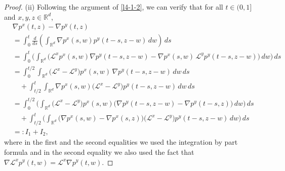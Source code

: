 \documentclass[a4paper,11pt]{amsart}
\newcommand{\R}{\mathds R}
\def\LL{{\mathcal L}}
\theoremstyle{definition}
\begin{document}
\begin{proof}
(ii) Following the  argument of  \eqref{l4-1-2}, we can verify that
for all $t\in (0,1]$ and $x,y,z \in \R^d$,
\begin{align*}
&\nabla p^x(t,z)-\nabla p^y(t,z)\\
&=\int_0^t \frac{d}{ds}\left(\int_{\R^d}
\nabla p^x(s,w)p^y(t-s,z-w)\,dw\right)\,ds\\
&=\int_0^t\bigg(\int_{\R^d}\Big( \LL^x p^x(s,w)\nabla p^y(t-s,z-w) -\nabla p^x(s,w)\, \LL^y
p^y(t-s,z-w)\Big)\,dw\bigg)\,ds\\
&=\int_0^{{t}/{2}}\int_{\R^d}\big( \LL^x- \LL^y\big) p^x(s,w)\,\nabla p^y(t-s,z-w)\,dw\,ds\\
&\quad +\int_{{t}/{2}}^t\int_{\R^d} \nabla p^x(s,w)\big( \LL^x- \LL^y\big)
p^y(t-s,z-w)\,dw\,ds\\
&=\int_0^{{t}/{2}}\bigg(\int_{\R^d}\big( \LL^x- \LL^y\big) p^x(s,w)
\big(\nabla p^y(t-s,z-w)-\nabla p^y(t-s,z)\big)\,dw\bigg)\,ds\\
&\quad +\int_{{t}/{2}}^t\bigg(\int_{\R^d} \big(\nabla p^x(s,w)-\nabla p^x(s,z)\big)  \big( \LL^x- \LL^y\big)
p^y(t-s,z-w)\,dw\bigg)\,ds\\
&=:I_1+I_2,
\end{align*} where in the first and the second equalities we used the integration by part formula
and  in the second equality we also used the fact that $\nabla  \LL^x p^y(t,w)= \LL^x \nabla p^y(t,w)$.


\end{proof}
\end{document}
